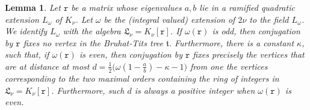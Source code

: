 \documentclass{article}
\newtheorem{Lem}[Prop]{Lemma}
\theoremstyle{definition}
\theoremstyle{remark}
\begin{document}
\begin{Lem}\label{l61d}
     Let $\mathtt{r}$ be a matrix whose eigenvalues $a,b$
     lie in a ramified quadratic extension 
     $L_\omega$ of $K_\nu$. 
       Let $\omega$ be the (integral valued) 
       extension of $2\nu$
     to the field $L_\omega$. We identify
     $L_\omega$ with the algebra
     $\mathfrak{L}_\nu=K_\nu[\mathtt{r}]$. 
     If $\omega(\mathtt{r})$ is odd,
    then conjugation by $\mathtt{r}$ fixes no vertex
    in the Bruhat-Tits tree $\mathfrak{t}$.
    Furthermore, there is a constant $\kappa$, such that,
    if $\omega(\mathtt{r})$ is even,
    then conjugation by $\mathtt{r}$ 
    fixes precisely the vertices that are at distance at most 
    $d=\frac12\big(\omega
    \left(1-\frac ab\right)-\kappa-1\big)$ 
    from one the vertices 
    corresponding to the two maximal orders 
    containing the ring 
    of integers in 
    $\mathfrak{L}_\nu=K_\nu[\mathtt{r}]$. Furthermore,
    such $d$ is always a positive integer when 
    $\omega(\mathtt{r})$ is even.
\end{Lem}
\end{document}
